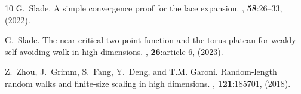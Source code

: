 \documentclass[11pt,hidelinks]{article}
\theoremstyle{plain}
\numberwithin{equation}{section}
\renewcommand{\(}{\left(}
\renewcommand{\)}{\right)}
\newcommand{\1}{\mathds{1}}
\begin{document}
{\begin{thebibliography}{10}
G.~Slade.
\newblock A simple convergence proof for the lace expansion.
, {\bf
  58}:26--33, (2022).

G.~Slade.
\newblock The near-critical two-point function and the torus plateau for weakly
  self-avoiding walk in high dimensions.
, {\bf 26}:article 6, (2023).

Z.~Zhou, J.~Grimm, S.~Fang, Y.~Deng, and T.M. Garoni.
\newblock Random-length random walks and finite-size scaling in high
  dimensions.
, {\bf 121}:185701, (2018).

\end{thebibliography}
}
\end{document}
